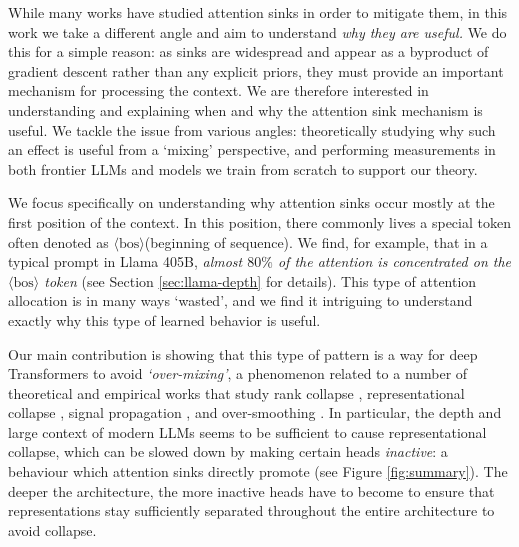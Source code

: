 \documentclass{article} %
\newcommand{\bos}{\ensuremath{\langle\text{bos}\rangle}\xspace}
\begin{document}
While many works have studied attention sinks in order to mitigate them, in this work we take a different angle and aim to understand \emph{why they are useful.} We do this for a simple reason: as sinks are widespread and appear as a byproduct of gradient descent rather than any explicit priors, they must provide an important mechanism for processing the context. We are therefore interested in understanding and explaining when and why the attention sink mechanism is useful. We tackle the issue from various angles: theoretically studying why such an effect is useful from a `mixing' perspective, and performing measurements in both frontier LLMs and models we train from scratch to support our theory.     

We focus specifically on understanding why attention sinks occur mostly at the first position of the context. In this position, there commonly lives a special token often denoted as \bos (beginning of sequence). We find, for example, that in a typical prompt in Llama 405B, \emph{almost $80\%$ of the attention is concentrated on the \bos token} (see Section \ref{sec:llama-depth} for details). This type of attention allocation is in many ways `wasted', and we find it intriguing to understand exactly why this type of learned behavior is useful. 

Our main contribution is showing that this type of pattern is a way for deep Transformers to avoid \emph{`over-mixing'}, a phenomenon related to a number of theoretical and empirical works that study rank collapse \citep{dong2021attention}, representational collapse \citep{barbero2024transformers}, signal propagation \citep{noci2022signal,arroyo2025vanishing}, and over-smoothing \citep{di2022understanding}. In particular, the depth and large context of modern LLMs seems to be sufficient to cause representational collapse, which can be slowed down by making certain heads \emph{inactive}: a behaviour which attention sinks directly promote (see Figure \ref{fig:summary}). The deeper the architecture, the more inactive heads have to become to ensure that representations stay sufficiently separated throughout the entire architecture to avoid collapse. 
\end{document}
